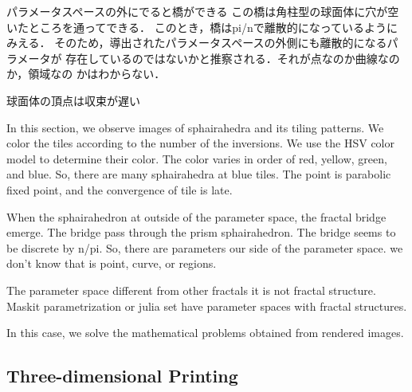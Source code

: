 \documentclass[dvipdfmx]{interact}
\theoremstyle{plain}%
\theoremstyle{definition}
\theoremstyle{remark}
\theoremstyle{problemstyle}
\begin{document}
パラメータスペースの外にでると橋ができる
この橋は角柱型の球面体に穴が空いたところを通ってできる．
このとき，橋はpi/nで離散的になっているようにみえる．
そのため，導出されたパラメータスペースの外側にも離散的になるパラメータが
存在しているのではないかと推察される．それが点なのか曲線なのか，領域なの
かはわからない．

球面体の頂点は収束が遅い

In this section, we observe images of sphairahedra and its tiling
patterns.
We color the tiles according to the number of the inversions.
We use the HSV color model to determine their color.
The color varies in order of red, yellow, green, and blue.
So, there are many sphairahedra at blue tiles.
The point is parabolic fixed point, and the convergence of tile is
late.

When the sphairahedron at outside of the parameter space,
the fractal bridge emerge.
The bridge pass through the prism sphairahedron.
The bridge seems to be discrete by n/pi.
So, there are parameters our side of the parameter space.
we don't know that is point, curve, or regions.

The parameter space different from other fractals it is not fractal
structure. Maskit parametrization or julia set have parameter spaces
with fractal structures.

In this case, we solve the mathematical problems obtained from rendered
images.

\subsection{Three-dimensional Printing}
\end{document}
